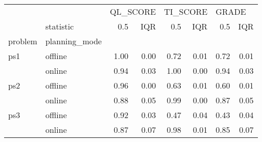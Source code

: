 \begin{tabular}{llrrrrrr}
\toprule
    & {} & \multicolumn{2}{l}{QL\_SCORE} & \multicolumn{2}{l}{TI\_SCORE} & \multicolumn{2}{l}{GRADE} \\
    & statistic &      0.5 &  IQR &      0.5 &  IQR &   0.5 &  IQR \\
problem & planning\_mode &          &      &          &      &       &      \\
\midrule
ps1 & offline &     1.00 & 0.00 &     0.72 & 0.01 &  0.72 & 0.01 \\
    & online &     0.94 & 0.03 &     1.00 & 0.00 &  0.94 & 0.03 \\
ps2 & offline &     0.96 & 0.00 &     0.63 & 0.01 &  0.60 & 0.01 \\
    & online &     0.88 & 0.05 &     0.99 & 0.00 &  0.87 & 0.05 \\
ps3 & offline &     0.92 & 0.03 &     0.47 & 0.04 &  0.43 & 0.04 \\
    & online &     0.87 & 0.07 &     0.98 & 0.01 &  0.85 & 0.07 \\
\bottomrule
\end{tabular}
